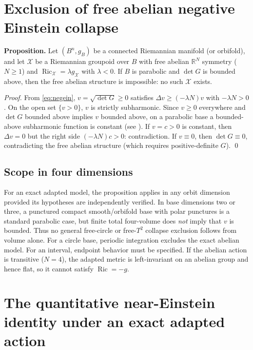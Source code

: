 \section{Exclusion of free abelian negative Einstein collapse}

\textbf{Proposition.}  Let $(B^n,g_B)$ be a connected Riemannian manifold
(or orbifold), and let $\mathcal X$ be a Riemannian groupoid over $B$
with free abelian $\mathbb R^N$ symmetry ($N\ge1$) and
$\operatorname{Ric}_{\mathcal X}=\lambda g_{\mathcal X}$ with $\lambda<0$.
If $B$ is parabolic and $\det G$ is bounded above, then the free abelian
structure is impossible: no such $\mathcal X$ exists.

\textit{Proof.}
From \eqref{eq:negein}, $v=\sqrt{\det G}\ge0$ satisfies
$\Delta v\ge(-\lambda N)v$ with $-\lambda N>0$.
On the open set $\{v>0\}$, $v$ is strictly subharmonic.
Since $v\ge0$ everywhere and $\det G$ bounded above implies $v$ bounded
above, on a parabolic base a bounded-above subharmonic function is
constant (see \cite[Thm.\ 5.1]{Grigoryan1999}).
If $v=c>0$ is constant, then $\Delta v=0$ but the right side
$(-\lambda N)c>0$: contradiction.
If $v\equiv0$, then $\det G\equiv0$, contradicting the free abelian
structure (which requires positive-definite $G$). \qed

\subsection*{Scope in four dimensions}
For an exact adapted model, the proposition applies in any orbit dimension
provided its hypotheses are independently verified.  In base dimensions two
or three, a punctured compact smooth/orbifold base with polar punctures is a
standard parabolic case, but finite total four-volume does \emph{not} imply
that $v$ is bounded.  Thus no general free-circle or free-$T^2$ collapse
exclusion follows from volume alone.  For a circle base, periodic integration
excludes the exact abelian model.  For an interval, endpoint behavior must be
specified.  If the abelian action is transitive ($N=4$), the adapted metric is
left-invariant on an abelian group and hence flat, so it cannot satisfy
$\operatorname{Ric}=-g$.
\section{The quantitative near-Einstein identity under an exact adapted action}

